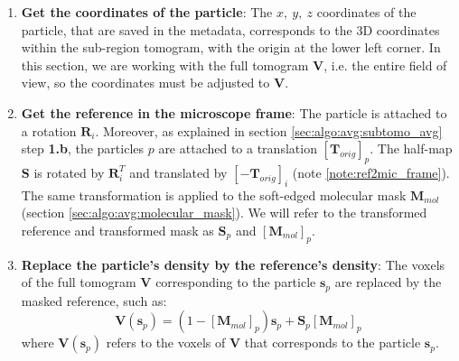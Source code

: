 \begin{enumerate}
    \item \textbf{Get the coordinates of the particle}: The $x,\ y,\ z$ coordinates of the particle, that are saved in the metadata, corresponds to the 3D coordinates within the sub-region tomogram, with the origin at the lower left corner. In this section, we are working with the full tomogram $\bm{V}$, i.e. the entire field of view, so the coordinates must be adjusted to $\bm{V}$.

    \item \textbf{Get the reference in the microscope frame}: The particle is attached to a rotation $\bm{R}_i$. Moreover, as explained in section \ref{sec:algo:avg:subtomo_avg} step \textbf{1.b}, the particles $p$ are attached to a translation ${[\bm{T}_{orig}]}_p$. The half-map $\bm{S}$ is rotated by $\bm{R}^{T}_i$ and translated by ${[-\bm{T}_{orig}]}_i$ (note \ref{note:ref2mic_frame}). The same transformation is applied to the soft-edged molecular mask $\bm{M}_{mol}$ (section \ref{sec:algo:avg:molecular_mask}). We will refer to the transformed reference and transformed mask as $\bm{S}_p$ and ${[\bm{M}_{mol}]}_p$.
    
    \item \textbf{Replace the particle's density by the reference's density}: The voxels of the full tomogram $\bm{V}$ corresponding to the particle $\bm{s}_p$ are replaced by the masked reference, such as:
    \begin{equation}
        \bm{V}(\bm{s}_p) = \left(1-{[\bm{M}_{mol}]}_p \right)\bm{s}_p + \bm{S}_p {[\bm{M}_{mol}]}_p
    \end{equation}
    where $\bm{V}(\bm{s}_p)$ refers to the voxels of $\bm{V}$ that corresponds to the particle $\bm{s}_p$.
\end{enumerate}




